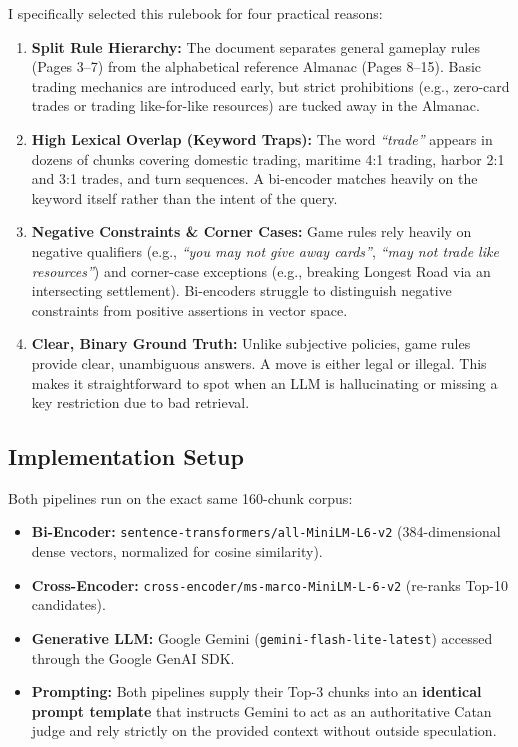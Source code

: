 \documentclass[11pt,a4paper]{article}
\begin{document}
I specifically selected this rulebook for four practical reasons:
\begin{enumerate}[itemsep=1.5pt,topsep=1.5pt]
    \item \textbf{Split Rule Hierarchy:} The document separates general gameplay rules (Pages 3--7) from the alphabetical reference Almanac (Pages 8--15). Basic trading mechanics are introduced early, but strict prohibitions (e.g., zero-card trades or trading like-for-like resources) are tucked away in the Almanac.
    \item \textbf{High Lexical Overlap (Keyword Traps):} The word \textit{``trade''} appears in dozens of chunks covering domestic trading, maritime 4:1 trading, harbor 2:1 and 3:1 trades, and turn sequences. A bi-encoder matches heavily on the keyword itself rather than the intent of the query.
    \item \textbf{Negative Constraints \& Corner Cases:} Game rules rely heavily on negative qualifiers (e.g., \textit{``you may not give away cards''}, \textit{``may not trade like resources''}) and corner-case exceptions (e.g., breaking Longest Road via an intersecting settlement). Bi-encoders struggle to distinguish negative constraints from positive assertions in vector space.
    \item \textbf{Clear, Binary Ground Truth:} Unlike subjective policies, game rules provide clear, unambiguous answers. A move is either legal or illegal. This makes it straightforward to spot when an LLM is hallucinating or missing a key restriction due to bad retrieval.
\end{enumerate}

\subsection{Implementation Setup}
Both pipelines run on the exact same 160-chunk corpus:
\begin{itemize}[itemsep=1.5pt,topsep=1.5pt]
    \item \textbf{Bi-Encoder:} \texttt{sentence-transformers/all-MiniLM-L6-v2} (384-dimensional dense vectors, normalized for cosine similarity).
    \item \textbf{Cross-Encoder:} \texttt{cross-encoder/ms-marco-MiniLM-L-6-v2} (re-ranks Top-10 candidates).
    \item \textbf{Generative LLM:} Google Gemini (\texttt{gemini-flash-lite-latest}) accessed through the Google GenAI SDK.
    \item \textbf{Prompting:} Both pipelines supply their Top-3 chunks into an \textbf{identical prompt template} that instructs Gemini to act as an authoritative Catan judge and rely strictly on the provided context without outside speculation.
\end{itemize}
\end{document}
